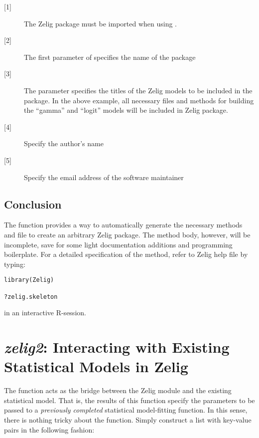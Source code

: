 \begin{description}

	\item[{[1]}] The Zelig package must be imported when using .

	\item[{[2]}] The first parameter of  specifies the name of the package

	\item[{[3]}] The  parameter specifies the titles of the Zelig models to be included in the package. In the above example, all necessary files and methods for building the ``gamma'' and ``logit'' models will be included in Zelig package.

	\item[{[4]}] Specify the author's name

	\item[{[5]}] Specify the email address of the software maintainer

\end{description}

\subsection{Conclusion}

The  function provides a way to automatically generate the necessary methods and file to create an arbitrary Zelig package. The method body, however, will be incomplete, save for some light documentation additions and programming boilerplate. For a detailed specification of the  method, refer to Zelig help file by typing:

\begin{verbatim}
library(Zelig)

?zelig.skeleton
\end{verbatim}

{\noindent}in an interactive R-session.
 

\section{\emph{zelig2}: Interacting with Existing Statistical Models in Zelig}
\label{section:zelig2}

The  function acts as the bridge between the Zelig module and the existing statistical model. That is, the results of this function specify the parameters to be passed to a \emph{previously completed} statistical model-fitting function. In this sense, there is nothing tricky about the  function. Simply construct a list with key-value pairs in the following fashion:

